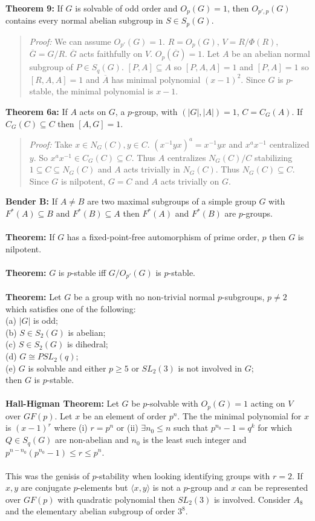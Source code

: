 {\bf Theorem 9:} If $G$ is solvable of odd order and $O_{p}(G)=1$, then $O_{p', p}(G)$ contains every
normal abelian subgroup in $S \in S_p(G)$.
\begin{quote}
\emph{Proof:}
We can assume $O_{p'}(G)=1$. $R= O_p(G)$, $V= R/\Phi(R)$, ${\overline G}= G/R$.
${\overline G}$ acts faithfully on $V$. $O_p({\overline G}) =1$.  Let $A$ be an abelian
normal subgroup of $P \in S_q(G)$. $[P, A] \subseteq A$ so $[P, A, A] = 1$ and $[P, A] =1$
so $[R,A,A]=1$ and ${\overline A}$ has minimal polynomial $(x-1)^2$.  Since $G$ is $p$-stable,
the minimal polynomial is $x-1$.
\end{quote}
{\bf Theorem 6a:} If $A$ acts on $G$, a $p$-group, with $(|G|, |A|)=1$, $C=C_G(A)$.
If $C_G(C) \subseteq C$ then $[A, G]=1$.
\begin{quote}
\emph{Proof:}
Take $x \in N_G(C), y \in C$.  $(x^{-1}yx)^a = x^{-1}yx$ and $x^ax^{-1}$ centralized $y$. So $x^ax^{-1} \in C_G(C) \subseteq C$.  Thus $A$ centralizes $N_G(C)/C$ stabilizing
$1 \subseteq C \subseteq N_G(C)$ and $A$ acts trivially in $N_G(C)$.  Thus $N_G(C) \subseteq C$.
Since $G$ is nilpotent, $G=C$ and $A$ acts trivially on $G$.
\end{quote}
{\bf Bender B:} If $A \ne B$ are two maximal subgroups of a simple group $G$ with
$F^*(A) \subseteq B$ and $F^*(B) \subseteq A$ then
$F^*(A)$ and $F^*(B)$ are $p$-groups.
\\
\\
{\bf Theorem:} If $G$ has a fixed-point-free automorphism of prime order, $p$ then $G$ is nilpotent.
\\
\\
{\bf Theorem:} $G$ is $p$-stable iff $G/O_{p'}(G)$ is $p$-stable.
\\
\\
{\bf Theorem:} Let $G$ be a group with no non-trivial normal $p$-subgroups, $p \ne 2$ which satisfies
one of the following:\\
(a) $|G|$ is odd;\\
(b) $S \in S_2(G)$ is abelian;\\
(c) $S \in S_2(G)$ is dihedral;\\
(d) $G \cong PSL_2(q)$;\\
(e)  $G$ is solvable and either $p \geq 5$ or $SL_2(3)$ is not involved in $G$;\\
then $G$ is $p$-stable.
\\
\\
{\bf Hall-Higman Theorem:} Let $G$ be $p$-solvable with $O_p(G)=1$ acting on $V$ over $GF(p)$.
Let $x$ be an element of order $p^n$. The the minimal polynomial for $x$ is $(x-1)^r$ where
(i) $r=p^n$ or (ii) $\exists n_0 \leq n$ such that $p^{n_0}-1= q^k$ for which $Q \in S_q(G)$
are non-abelian and $n_0$ is the least such integer and $p^{n-n_0}(p^{n_0}-1) \leq r \leq p^n$.
\\
\\
This was the genisis of $p$-stability when looking identifying groups with $r=2$.  If $x, y$
are conjugate $p$-elements but $\langle x, y \rangle$ is not a $p$-group and $x$ can be represented
over $GF(p)$ with quadratic polynomial then $SL_2(3)$ is involved.  Consider $A_8$ and the
elementary abelian subgroup of order $3^8$.
